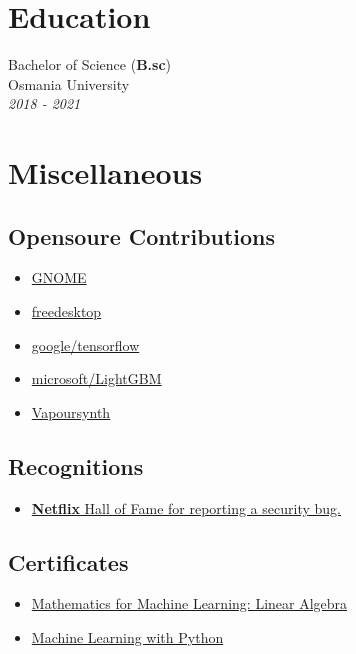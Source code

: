 \documentclass{article}
\begin{document}
\section{Education}
Bachelor of Science (\textbf{B.sc}) \\
Osmania University \\
\emph{2018 - 2021}



\section{Miscellaneous}


 \subsection{Opensoure Contributions}
 \begin{multicols}{4}
 \begin{itemize}
     \item \href{https://gitlab.gnome.org/jkotra}{GNOME}
     \item \href{https://gitlab.freedesktop.org/jkotra}{freedesktop}
     \item \href{https://github.com/tensorflow/tensorflow}{google/tensorflow}
     \item \href{https://github.com/microsoft/LightGBM}{microsoft/LightGBM}
     \item \href{https://github.com/vapoursynth/vapoursynth}{Vapoursynth}
 \end{itemize}
\end{multicols}

\subsection{Recognitions}

\begin{itemize}
    \item \href{https://bugcrowd.com/netflix/hall-of-fame}{\textbf{Netflix} Hall of Fame for reporting a security bug.}
\end{itemize}


\subsection{Certificates}

\begin{itemize}
    \item \href{https://www.coursera.org/account/accomplishments/certificate/E2FE7HNXWP8J}{Mathematics for Machine Learning: Linear Algebra}
    \item \href{https://www.coursera.org/account/accomplishments/certificate/QDPTGAQSXZNM}{Machine Learning with Python}
\end{itemize}
\end{document}

